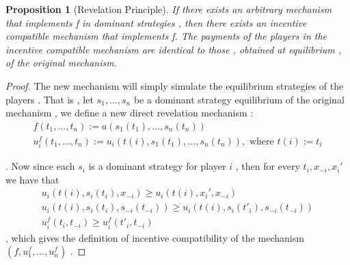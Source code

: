 \documentclass[10pt,reqno]{amsart}
\newtheorem{pro}{Proposition}[section]
\theoremstyle{definition}
\theoremstyle{remark}
\numberwithin{equation}{section}
\begin{document}
\begin{pro}[Revelation Principle]
If there exists an arbitrary mechanism that implements f in dominant strategies , then there exists an incentive compatible mechanism that implements f. The payments of the players in the incentive compatible mechanism are identical to those , obtained at equilibrium , of the original mechanism.
\end{pro}

\begin{proof}
The new mechanism will simply simulate the equilibrium strategies of the players . That is , let $s_1,...,s_n$ be a dominant strategy equilibrium of the original mechanism , we define a new direct revelation mechanism : 
\begin{eqnarray}
f(t_1,...,t_n):=a(s_1(t_1),...,s_n(t_n)) \\
 u_i^f(t_1,...,t_n):=u_i(t(i), s_1(t_1),...,s_n(t_n)), \text{ where } t(i) := t_i
\end{eqnarray}

 . Now since each $s_i$ is a dominant strategy for player $i$ , then for every $t_i,x_{-i},x_i'$ we have that 
\begin{eqnarray}
 u_i(t(i),   s_i(t_i),x_{-i})\ge u_i(t(i),x_i',x_{-i})\\
 u_i\left(t(i),   s_i(t_i),s_{-i}(t_{-i})  \right) \ge  u_i\left(t(i),   s_i(t'_i),s_{-i}(t_{-i})  \right) \\
 u_i^f(t_i,t_{-i} )\geq u_i^f(t'_i,t_{-i} )
\end{eqnarray}
, which gives the definition of incentive compatibility of the mechanism $(f,u_1^f,...,u_n^f)$ .

\end{proof}
\end{document}
